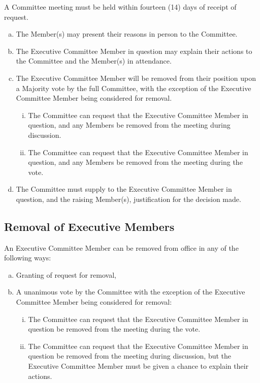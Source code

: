 \documentclass[a4paper,12pt]{article}
\begin{document}
A Committee meeting must be held within fourteen (14) days of receipt of request.

\begin{enumerate}[a)]
	\item The Member(s) may present their reasons in person to the Committee.
	\item The Executive Committee Member in question may explain their actions to the Committee and the Member(s) in attendance.
	\item The Executive Committee Member will be removed from their position upon a Majority vote by the full Committee, with the exception of the Executive Committee Member being considered for removal.
	\begin{enumerate}[i)]
		\item The Committee can request that the Executive Committee Member in question, and any Members be removed from the meeting during discussion.
		\item The Committee can request that the Executive Committee Member in question, and any Members be removed from the meeting during the vote.
	\end{enumerate}
	\item The Committee must supply to the Executive Committee Member in question, and the raising Member(s), justification for the decision made.
\end{enumerate}

\subsection{Removal of Executive Members}

An Executive Committee Member can be removed from office in any of the following ways:

\begin{enumerate}[a)]
	\item Granting of request for removal,
	\item A unanimous vote by the Committee with the exception of the Executive Committee Member being considered for removal:
	\begin{enumerate}[i)]
		\item The Committee can request that the Executive Committee Member in question be removed from the meeting during the vote.
		\item The Committee can request that the Executive Committee Member in question be removed from the meeting during discussion, but the Executive Committee Member must be given a chance to explain their actions.
	\end{enumerate}
\end{enumerate}
\end{document}
